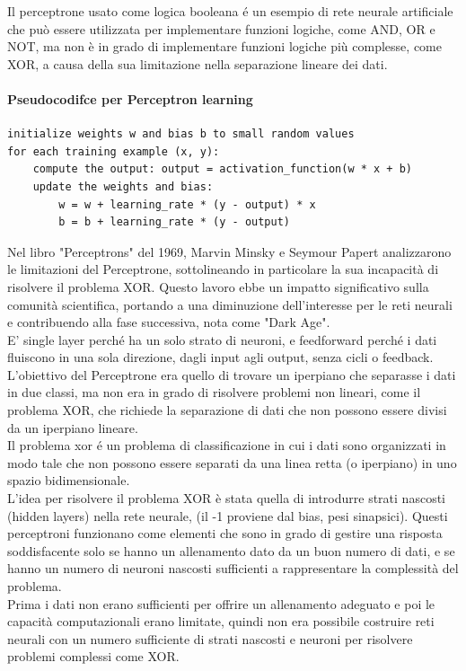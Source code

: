 Il perceptrone usato come logica booleana é un esempio di rete neurale artificiale che può essere utilizzata 
per implementare funzioni logiche, come AND, OR e NOT, ma non è in grado di implementare funzioni logiche più complesse, 
come XOR, a causa della sua limitazione nella separazione lineare dei dati.\\

\paragraph{Pseudocodifce per Perceptron learning}
\begin{verbatim}
initialize weights w and bias b to small random values
for each training example (x, y):
    compute the output: output = activation_function(w * x + b)
    update the weights and bias:
        w = w + learning_rate * (y - output) * x
        b = b + learning_rate * (y - output)
\end{verbatim}

Nel libro "Perceptrons" del 1969, Marvin Minsky e Seymour Papert analizzarono le limitazioni del Perceptrone,
sottolineando in particolare la sua incapacità di risolvere il problema XOR. Questo lavoro ebbe un impatto significativo 
sulla comunità scientifica, portando a una diminuzione dell'interesse per le reti neurali e contribuendo alla fase successiva, 
nota come "Dark Age".\\
E' single layer perché ha un solo strato di neuroni, e feedforward perché i dati fluiscono in una sola direzione, 
dagli input agli output, senza cicli o feedback.\\

L'obiettivo del Perceptrone era quello di trovare un iperpiano che separasse i dati in due classi, 
ma non era in grado di risolvere problemi non lineari, come il problema XOR, che richiede la separazione di dati 
che non possono essere divisi da un iperpiano lineare.\\
Il problema xor é un problema di classificazione in cui i dati sono organizzati in modo tale che non possono 
essere separati da una linea retta (o iperpiano) in uno spazio bidimensionale.\\

L'idea per risolvere il problema XOR è stata quella di introdurre strati nascosti (hidden layers) nella rete neurale,
(il -1 proviene dal bias, pesi sinapsici). 
Questi perceptroni funzionano come elementi che sono in grado di gestire una risposta soddisfacente solo se hanno un allenamento 
dato da un buon numero di dati, e se hanno un numero di neuroni nascosti sufficienti a rappresentare la complessità del problema.\\
Prima i dati non erano sufficienti per offrire un allenamento adeguato e poi le capacità computazionali erano limitate, quindi non 
era possibile costruire reti neurali con un numero sufficiente di strati nascosti e neuroni per risolvere problemi complessi come XOR.\\

